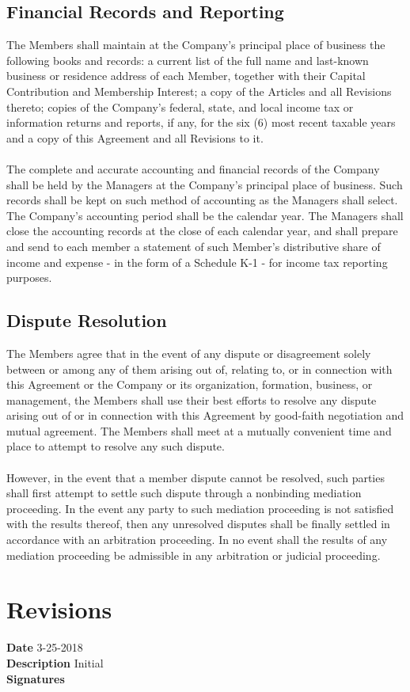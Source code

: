 \documentclass[11pt]{article}
\begin{document}
\subsection{Financial Records and Reporting}
The Members shall maintain at the Company's principal place of business the following books and records: a current list of the full name and last-known business or residence address of each Member, together with their Capital Contribution and Membership Interest; a copy of the Articles and all Revisions thereto; copies of the Company's federal, state, and local income tax or information returns and reports, if any, for the six (6) most recent taxable years and a copy of this Agreement and all Revisions to it.\\\\
The complete and accurate accounting and financial records of the Company shall be held by the Managers at the Company's principal place of business. Such records shall be kept on such method of accounting as the Managers shall select. The Company's accounting period shall be the calendar year. The Managers shall close the accounting records at the close of each calendar year, and shall prepare and send to each member a statement of such Member's distributive share of income and expense - in the form of a Schedule K-1 - for income tax reporting purposes.

\subsection{Dispute Resolution}
The Members agree that in the event of any dispute or disagreement solely between or among any of them arising out of, relating to, or in connection with this Agreement or the Company or its organization, formation, business, or management, the Members shall use their best efforts to resolve any dispute arising out of or in connection with this Agreement by good-faith negotiation and mutual agreement. The Members shall meet at a mutually convenient time and place to attempt to resolve any such dispute.\\\\
However, in the event that a member dispute cannot be resolved, such parties shall first attempt to settle such dispute through a nonbinding mediation proceeding. In the event any party to such mediation proceeding is not satisfied with the results thereof, then any unresolved disputes shall be finally settled in accordance with an arbitration proceeding. In no event shall the results of any mediation proceeding be admissible in any arbitration or judicial proceeding.


\section{Revisions}
\label{sec:revisions}

\begin{minipage}{\textwidth}
\textbf{Date} 3-25-2018 \\
\textbf{Description} Initial \\
\textbf{Signatures} \\\\
\end{minipage}

\vspace*{\fill}

\begin{flushright}

\pdfcreationdate
\end{flushright}
\end{document}
